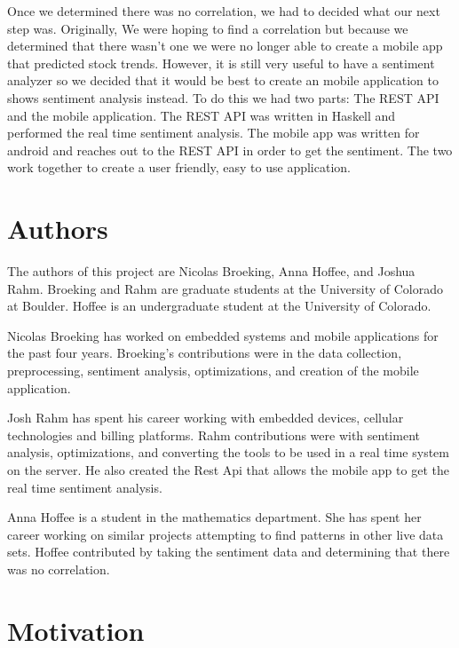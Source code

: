 \documentclass{acm_proc_article-sp}
\begin{document}
Once we determined there was no correlation, we had to decided what our
next step was. Originally, We were hoping to find a correlation but because we determined
that there wasn't one we were no longer able to create a mobile app
that predicted stock trends. However, it is still very useful to have a
sentiment analyzer so we decided that it would be best to create an mobile application to
shows sentiment analysis instead. To do this we had two parts: The REST API
and the mobile application. The REST API was written in Haskell and performed the real
time sentiment analysis.  The mobile app was written for android and reaches out
to the REST API in order to get the sentiment. The two work together to create a user
friendly, easy to use application.


\section{Authors}

The authors of this project are Nicolas Broeking, Anna
Hoffee, and Joshua Rahm. Broeking and Rahm are graduate students at the
University of Colorado at Boulder. Hoffee is an undergraduate student at the
University of Colorado.

Nicolas Broeking has worked on embedded systems and mobile applications for
the past four years. Broeking's contributions were in the data collection,
preprocessing, sentiment analysis, optimizations, and creation of the mobile
application. 

Josh Rahm has spent his career working with embedded devices, cellular
technologies and billing platforms. Rahm contributions were with sentiment
analysis, optimizations, and converting the tools to be used in a real time
system on the server. He also created  the Rest Api that allows the mobile app to get
the real time sentiment analysis.

Anna Hoffee is a student in the mathematics department. She has spent her
career working on similar projects attempting to find patterns in other live
data sets. Hoffee contributed by taking the sentiment data and determining that
there was no correlation.

\section{Motivation}
\end{document}

